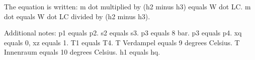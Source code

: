 The equation is written:  
m dot multiplied by (h2 minus h3) equals W dot LC.  
m dot equals W dot LC divided by (h2 minus h3).  

Additional notes:  
p1 equals p2.  
s2 equals s3.  
p3 equals 8 bar.  
p3 equals p4.  
xq equals 0, xz equals 1.  
T1 equals T4.  
T Verdampel equals 9 degrees Celsius.  
T Innenraum equals 10 degrees Celsius.  
h1 equals hq.